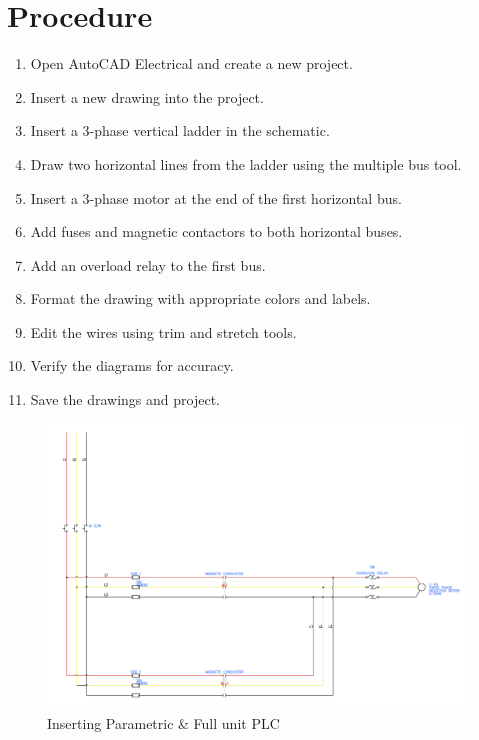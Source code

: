\documentclass[12pt]{article}
\begin{document}
\section*{Procedure}
\begin{enumerate}
    \item Open AutoCAD Electrical and create a new project.
    \item Insert a new drawing into the project.
    \item Insert a 3-phase vertical ladder in the schematic.
    \item Draw two horizontal lines from the ladder using the multiple bus tool.
    \item Insert a 3-phase motor at the end of the first horizontal bus.
    \item Add fuses and magnetic contactors to both horizontal buses.
    \item Add an overload relay to the first bus.
    \item Format the drawing with appropriate colors and labels.
    \item Edit the wires using trim and stretch tools.
    \item Verify the diagrams for accuracy.
    \item Save the drawings and project.
\end{enumerate}


\begin{figure}[H]
    \centering
    \includegraphics[width=\textwidth]{1.png}
    \caption{Inserting Parametric \& Full unit PLC}
    \label{fig:insert}
\end{figure}
\end{document}
